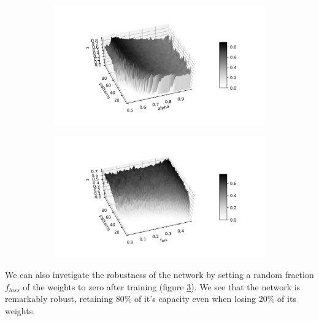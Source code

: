 \documentclass{article}
\begin{document}
\begin{figure}[h]
	\centering
	\begin{subfigure}[t]{0.44\linewidth}
		\centering
		\includegraphics[width = 1.0\linewidth, trim={90 30 50 40}, clip=true]{scan_alpha_npat.png}
		\label{fig:alpha}	
	\end{subfigure}%
	\hspace{0.05\linewidth}
	\begin{subfigure}[t]{0.44\linewidth}
		\centering
		\includegraphics[width = 1.0\linewidth, trim={90 30 50 40}, clip=true]{scan_floss_npat.png}
		\label{fig:floss}	
	\end{subfigure}%
\end{figure}

We can also invetigate the robustness of the network by setting a random fraction $f_{loss}$ of the weights to zero after training (figure \ref{fig:floss}). We see that the network is remarkably robust, retaining 80\% of it's capacity even when losing 20\% of its weights.
\end{document}

